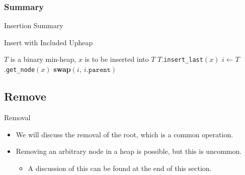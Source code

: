 \documentclass[10pt,compress]{beamer}
\begin{document}
\subsubsection{Summary}

\begin{frame}{Insertion Summary}
  \begin{algorithm}[H]
    \caption{Insert with Included Upheap}\label{alg:heap_insert}
    \begin{algorithmic}
      \Require $T$ is a binary min-heap, $x$ is to be inserted into $T$
      \State $T$.\texttt{insert\_last}$(x)$  
      \State $i \gets T$.\texttt{get\_node}$(x)$
      \State \textbf{swap}$(i,\ i\text{.}\texttt{parent})$ 
      \EndWhile
    \end{algorithmic}
  \end{algorithm}
\end{frame}

\subsection{Remove}

\begin{frame}{Removal}
  \begin{itemize}
    \item We will discuss the removal of the root, which is a common operation.
    \item Removing an arbitrary node in a heap is possible, but this is uncommon.
          \begin{itemize}
            \item A discussion of this can be found at the end of this section.
          \end{itemize}
  \end{itemize}
\end{frame}
\end{document}
